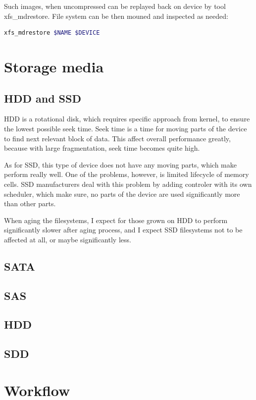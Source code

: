 \documentclass[
  color, %
  table, %
  lof,   %
  lot,   %
]{fithesis3}
\begin{document}
Such images, when uncompressed can be replayed back on device by tool xfs\_mdrestore. File system can be then mouned and inspected as needed:

\begin{lstlisting}[language=bash]
  xfs_mdrestore $NAME $DEVICE
\end{lstlisting}

\chapter{Storage media}
\section{HDD and SSD}
HDD is a rotational disk, which requires specific approach from kernel, to ensure the lowest possible seek time. Seek time is a time for moving parts of the device to find next relevant block of data. This affect overall performance greatly, because with large fragmentation, seek time becomes quite high.

As for SSD, this type of device does not have any moving parts, which make perform really well. One of the problems, however, is limited lifecycle of memory cells. SSD manufacturers deal with this problem by adding controler with its own scheduler, which make sure, no parts of the device are used significantly more than other parts.

When aging the filesystems, I expect for those grown on HDD to perform significantly slower after aging process, and I expect SSD filesystems not to be affected at all, or maybe significantly less.


\section{SATA}
\section{SAS}
\section{HDD}
\section{SDD}

\chapter{Workflow}
\end{document}

